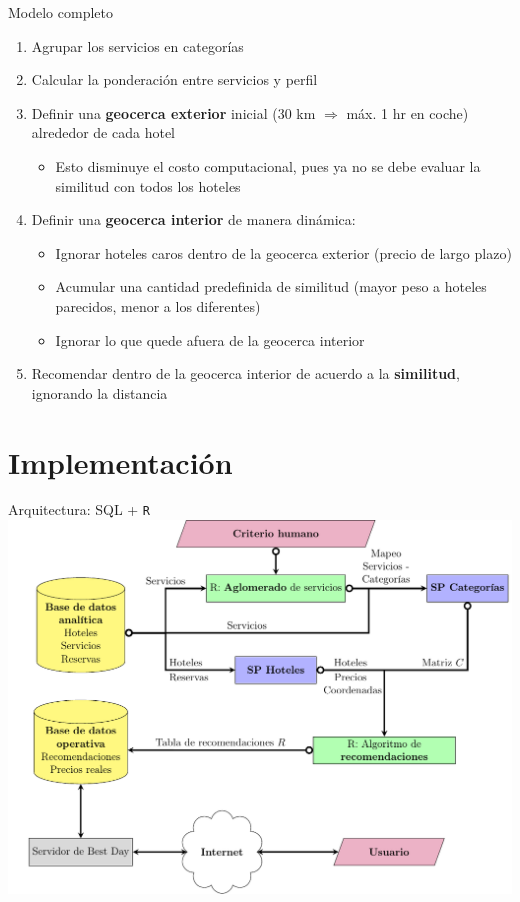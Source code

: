 \documentclass{beamer}
\begin{document}
\begin{frame}{Modelo completo}
	\begin{enumerate}%
		\item Agrupar los servicios en categorías
		\item Calcular la ponderación entre servicios y perfil
		\item Definir una \textbf{geocerca exterior} inicial (30 km $\Rightarrow$ máx. 1 hr en coche) alrededor de cada hotel
		\begin{itemize}
			\item Esto disminuye el costo computacional, pues ya no se debe evaluar la similitud con todos los hoteles
		\end{itemize}
		\item Definir una \textbf{geocerca interior} de manera dinámica:
		\begin{itemize}
			\item Ignorar hoteles caros dentro de la geocerca exterior (precio de largo plazo)
			\item Acumular una cantidad predefinida de similitud (mayor peso a hoteles parecidos, menor a los diferentes)
			\item Ignorar lo que quede afuera de la geocerca interior
		\end{itemize}
		\item Recomendar dentro de la geocerca interior de acuerdo a la \textbf{similitud}, ignorando la distancia
	\end{enumerate}
\end{frame}

\section{Implementación}

\begin{frame}{Arquitectura: SQL + \texttt{R}}
	\includegraphics[width=\textwidth]{imagenes/flowchart.pdf}
\end{frame}
\end{document}
